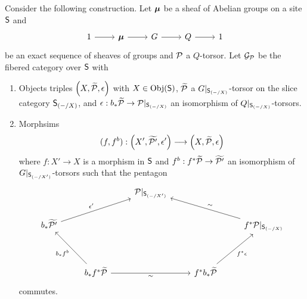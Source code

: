\begin{definition}\label{def: category g sub p}
    Consider the following construction. Let $\bm{\mu}$ be a sheaf of Abelian groups on a site $\mathsf{S}$ and 
    $$%
    \begin{tikzcd}
	1 & \Bmu & G & Q & 1
	\arrow[from=1-1, to=1-2]
	\arrow[from=1-2, to=1-3]
	\arrow[from=1-3, to=1-4]
	\arrow[from=1-4, to=1-5]
    \end{tikzcd}$$
    be an exact sequence of sheaves of groups and $\mathcal{P}$ a $Q$-torsor. Let $\mathcal{G}_{\mathcal{P}}$ be the fibered category over $\mathsf{S}$ with 
    \begin{enumerate}[label=(\alph*)]
        \item Objects triples $\left(X,\widetilde{\mathcal{P}},\epsilon\right)$ with $X\in\mathrm{Obj}(\mathsf{S})$, $\widetilde{\mathcal{P}}$ a $G|_{\mathsf{S}_{(-/X)}}$-torsor on the slice category $\mathsf{S}_{(-/X)}$, and $\epsilon:b_{*}\widetilde{\mathcal{P}}\to\mathcal{P}|_{\mathsf{S}_{(-/X)}}$ an isomorphism of $Q|_{\mathsf{S}_{(-/X)}}$-torsors. 
        \item Morphsims 
        $$(f,f^{b}):\left(X',\widetilde{\mathcal{P}'},\epsilon'\right)\longrightarrow\left(X,\widetilde{\mathcal{P}},\epsilon\right)$$
        where $f:X'\to X$ is a morphism in $\mathsf{S}$ and $f^{b}:f^{*}\widetilde{\mathcal{P}}\to\widetilde{\mathcal{P}'}$ an isomorphism of $G|_{\mathsf{S}_{(-/X')}}$-torsors such that the pentagon 
        $$%
        \begin{tikzcd}
            && {\Pcal|_{\Ssf_{(-/X')}}} \\
            {b_{*}\widetilde{\Pcal'}} &&&& {f^{*}\Pcal|_{\Ssf_{(-/X)}}} \\
            \\
            & {b_{*}f^{*}\widetilde{\Pcal}} && {f^{*}b_{*}\widetilde{\Pcal}}
            \arrow["\sim"', from=4-2, to=4-4]
            \arrow["{f^{*}\epsilon}"', from=4-4, to=2-5]
            \arrow["\sim"', from=2-5, to=1-3]
            \arrow["{\epsilon'}", from=2-1, to=1-3]
            \arrow["{b_{*}f^{b}}", from=4-2, to=2-1]
        \end{tikzcd}$$
        commutes. 
    \end{enumerate}
\end{definition}
